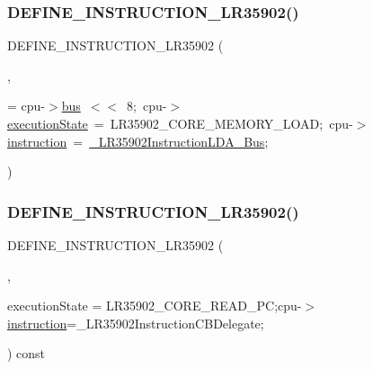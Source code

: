 \mbox{\label{isa-lr35902_8c_ad89ac2ada46edf970a5fc7d0278ffbb1}} 
\subsubsection{\texorpdfstring{D\+E\+F\+I\+N\+E\+\_\+\+I\+N\+S\+T\+R\+U\+C\+T\+I\+O\+N\+\_\+\+L\+R35902()}{DEFINE\_INSTRUCTION\_LR35902()}\hspace{0.1cm}{\footnotesize\ttfamily [19/20]}}
{\footnotesize\ttfamily D\+E\+F\+I\+N\+E\+\_\+\+I\+N\+S\+T\+R\+U\+C\+T\+I\+O\+N\+\_\+\+L\+R35902 (\begin{DoxyParamCaption}\item[{L\+D\+A\+I\+Finish}]{,  }\item[{cpu-\/$>$\mbox{\hyperlink{isa-lr35902_8c_ac9ee548085af12859cb52a6c757cf73a}{index}}$\vert$}]{ = {\ttfamily cpu-\/$>$\mbox{\hyperlink{isa-lr35902_8c_a6163e7e073b87ad067db0a3b10da6be9}{bus}}~$<$$<$~8;~cpu-\/$>$\mbox{\hyperlink{isa-lr35902_8c_a087a53d4d283226a73c530dd2883d634}{execution\+State}}~=~LR35902\+\_\+CORE\+\_\+MEMORY\+\_\+LOAD;~cpu-\/$>$\mbox{\hyperlink{isa-lr35902_8c_a516462a0e821c76277faaeb2a1364b35}{instruction}}~=~\mbox{\hyperlink{isa-lr35902_8c_af7d32b9936d0cef4c3331be122f32e13}{\+\_\+\+L\+R35902\+Instruction\+L\+D\+A\+\_\+\+Bus}};} }\end{DoxyParamCaption})}

\mbox{\label{isa-lr35902_8c_a2c0136f44ea637ff7143f439c53d34f6}} 
\subsubsection{\texorpdfstring{D\+E\+F\+I\+N\+E\+\_\+\+I\+N\+S\+T\+R\+U\+C\+T\+I\+O\+N\+\_\+\+L\+R35902()}{DEFINE\_INSTRUCTION\_LR35902()}\hspace{0.1cm}{\footnotesize\ttfamily [20/20]}}
{\footnotesize\ttfamily D\+E\+F\+I\+N\+E\+\_\+\+I\+N\+S\+T\+R\+U\+C\+T\+I\+O\+N\+\_\+\+L\+R35902 (\begin{DoxyParamCaption}\item[{CB}]{,  }\item[{cpu-\/$>$}]{execution\+State = {\ttfamily LR35902\+\_\+CORE\+\_\+READ\+\_\+PC;cpu-\/$>$\mbox{\hyperlink{isa-lr35902_8c_a516462a0e821c76277faaeb2a1364b35}{instruction}}=\+\_\+LR35902InstructionCBDelegate;} }\end{DoxyParamCaption}) const}

